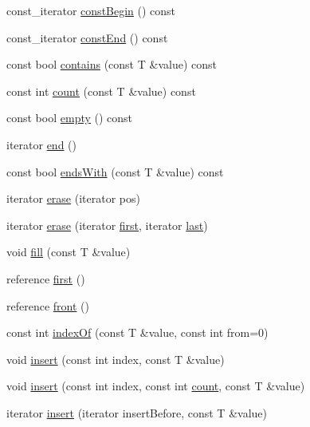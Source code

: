 \begin{DoxyCompactItemize}
\item 
const\+\_\+iterator \hyperlink{namespaceprism_1_1aux_a759427246ea193f15c34088ed1bc56db}{const\+Begin} () const 
\item 
const\+\_\+iterator \hyperlink{namespaceprism_1_1aux_aaaf4b387a907a2c27c35328a68956991}{const\+End} () const 
\item 
const bool \hyperlink{namespaceprism_1_1aux_a4e0c925fe7f93dd8533f7b9ed6d6ab0f}{contains} (const T \&value) const 
\item 
const int \hyperlink{namespaceprism_1_1aux_a14e4de22b19399e53423b408f624d866}{count} (const T \&value) const 
\item 
const bool \hyperlink{namespaceprism_1_1aux_a83f1998dde2fd622124b8e727e19e143}{empty} () const 
\item 
iterator \hyperlink{namespaceprism_1_1aux_a335f8dc9d05813c1eb69233ed66eea3d}{end} ()
\item 
const bool \hyperlink{namespaceprism_1_1aux_ad7f19ac06a01a1831a83c94c3d5633bc}{ends\+With} (const T \&value) const 
\item 
iterator \hyperlink{namespaceprism_1_1aux_ab57a97c10c7ffe497544eabb5819c236}{erase} (iterator pos)
\item 
iterator \hyperlink{namespaceprism_1_1aux_a014ff705700f2d842f1be0546bc30875}{erase} (iterator \hyperlink{namespaceprism_1_1aux_a16674f8b7bafe0844292be51e17dafa1}{first}, iterator \hyperlink{namespaceprism_1_1aux_a23a89c64fd9ee1f27799fe56c943a44d}{last})
\item 
void \hyperlink{namespaceprism_1_1aux_a3bd81ac98dc51b1741262ae9bcddf1e0}{fill} (const T \&value)
\item 
reference \hyperlink{namespaceprism_1_1aux_a16674f8b7bafe0844292be51e17dafa1}{first} ()
\item 
reference \hyperlink{namespaceprism_1_1aux_a072486b8ada0a0e862b2db17dc78b218}{front} ()
\item 
const int \hyperlink{namespaceprism_1_1aux_a7f21082e4df92e571f6d251ed68987a3}{index\+Of} (const T \&value, const int from=0)
\item 
void \hyperlink{namespaceprism_1_1aux_a8c71b4a5c4b411080d5eb9f6838cafc4}{insert} (const int index, const T \&value)
\item 
void \hyperlink{namespaceprism_1_1aux_a3aa62fda77a8d7b6c7ad69667ef1933a}{insert} (const int index, const int \hyperlink{namespaceprism_1_1aux_a14e4de22b19399e53423b408f624d866}{count}, const T \&value)
\item 
iterator \hyperlink{namespaceprism_1_1aux_aa6279cb02a74270d3bff40cf30544435}{insert} (iterator insert\+Before, const T \&value)

\end{DoxyCompactItemize}
